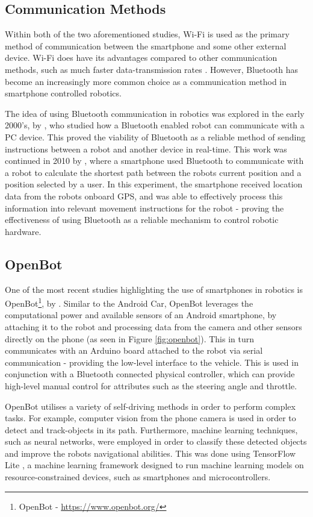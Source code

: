 \documentclass{l4proj}
\begin{document}
\subsection{Communication Methods}
Within both of the two aforementioned studies, Wi-Fi is used as the primary method of communication between the smartphone and some other external device. Wi-Fi does have its advantages compared to other communication methods, such as much faster data-transmission rates \citep{hassan2012review}. However, Bluetooth has become an increasingly more common choice as a communication method in smartphone controlled robotics.

The idea of using Bluetooth communication in robotics was explored in the early 2000’s, by \citet{fai2002bluetooth}, who studied how a Bluetooth enabled robot can communicate with a PC device. This proved the viability of Bluetooth as a reliable method of sending instructions between a robot and another device in real-time. This work was continued in 2010 by \citet{nasereddin2010smartphone}, where a smartphone used Bluetooth to communicate with a robot to calculate the shortest path between the robots current position and a position selected by a user. In this experiment, the smartphone received location data from the robots onboard GPS, and was able to effectively process this information into relevant movement instructions for the robot - proving the effectiveness of using Bluetooth as a reliable mechanism to control robotic hardware.

\subsection{OpenBot} \label{sec:openbot}
One of the most recent studies highlighting the use of smartphones in robotics is OpenBot\footnote{OpenBot - \url{https://www.openbot.org/}}, by \citet{muller2021openbot}. Similar to the Android Car, OpenBot leverages the computational power and available sensors of an Android smartphone, by attaching it to the robot and processing data from the camera and other sensors directly on the phone (as seen in Figure \ref{fig:openbot}). This in turn communicates with an Arduino board attached to the robot via serial communication - providing the low-level interface to the vehicle. This is used in conjunction with a Bluetooth connected physical controller, which can provide high-level manual control for attributes such as the steering angle and throttle.

OpenBot utilises a variety of self-driving methods in order to perform complex tasks. For example, computer vision from the phone camera is used in order to detect and track-objects in its path. Furthermore, machine learning techniques, such as neural networks, were employed in order to classify these detected objects and improve the robots navigational abilities. This was done using TensorFlow Lite \citep{tensorflowlite}, a machine learning framework designed to run machine learning models on resource-constrained devices, such as smartphones and microcontrollers.
\end{document}
